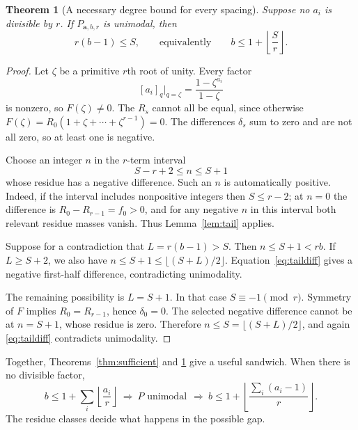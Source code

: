 \documentclass[11pt]{article}
\theoremstyle{research}
\newtheorem{theorem}{Theorem}[section]
\theoremstyle{definition}
\newcommand{\qi}[1]{[#1]_q}
\numberwithin{equation}{section}
\begin{document}
\begin{theorem}[A necessary degree bound for every spacing]\label{thm:degreebound}
Suppose no $a_i$ is divisible by $r$. If $P_{\boldsymbol a,b,r}$ is
unimodal, then
\begin{equation}\label{eq:necessarydegree}
 r(b-1)\le S,
 \qquad\text{equivalently}\qquad
 b\le1+\left\lfloor\frac Sr\right\rfloor.
\end{equation}
\end{theorem}
\begin{proof}
Let $\zeta$ be a primitive $r$th root of unity.
Every factor
\[
 \qi{a_i}\big|_{q=\zeta}=
       \frac{1-\zeta^{a_i}}{1-\zeta}
\]
is nonzero, so $F(\zeta)\ne0$. The $R_s$ cannot all be equal, since
otherwise $F(\zeta)=R_0(1+\zeta+\cdots+\zeta^{r-1})=0$.
The differences $\delta_s$ sum to zero and are not all zero, so at least
one is negative.

Choose an integer $n$ in the $r$-term interval
\[
 S-r+2\le n\le S+1
\]
whose residue has a negative difference. Such an $n$ is automatically
positive. Indeed, if the interval includes nonpositive integers then
$S\le r-2$; at $n=0$ the difference is $R_0-R_{r-1}=f_0>0$,
and for any negative $n$ in this interval both relevant residue masses
vanish.
Thus Lemma~\ref{lem:tail} applies.

Suppose for a contradiction that $L=r(b-1)>S$.
Then $n\le S+1<rb$. If $L\ge S+2$, we also have
$n\le S+1\le\lfloor(S+L)/2\rfloor$. Equation~\eqref{eq:taildiff}
gives a negative first-half difference, contradicting unimodality.

The remaining possibility is $L=S+1$. In that case
$S\equiv-1\pmod r$. Symmetry of $F$ implies $R_0=R_{r-1}$, hence
$\delta_0=0$. The selected negative difference cannot be at $n=S+1$,
whose residue is zero. Therefore $n\le S=\lfloor(S+L)/2\rfloor$,
and again \eqref{eq:taildiff} contradicts unimodality.
\end{proof}

Together, Theorems~\ref{thm:sufficient} and \ref{thm:degreebound} give a
useful sandwich. When there is no divisible factor,
\begin{equation}\label{eq:sandwich}
 b\le1+\sum_i\left\lfloor\frac{a_i}{r}\right\rfloor
 \ \Longrightarrow\ P\text{ unimodal}\
 \ \Longrightarrow\
 b\le1+\left\lfloor\frac{\sum_i(a_i-1)}r\right\rfloor.
\end{equation}
The residue classes decide what happens in the possible gap.
\end{document}
